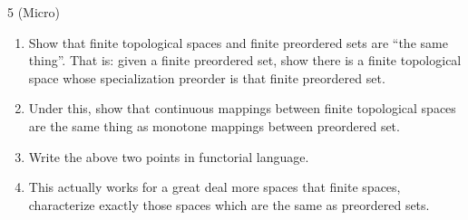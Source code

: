 \begin{exercise}{5 (Micro)}
\begin{enumerate}
    \item Show that finite topological spaces and finite preordered sets are ``the same thing''. 
    That is: 
    given a finite preordered set, show there is a finite topological space whose specialization preorder is that finite preordered set.
    \item Under this, show that continuous mappings between finite topological spaces are the same thing as monotone mappings between preordered set.
    \item Write the above two points in functorial language.
    \item This actually works for a great deal more spaces that finite spaces, characterize exactly those spaces which are the same as preordered sets.
\end{enumerate}
\end{exercise}
